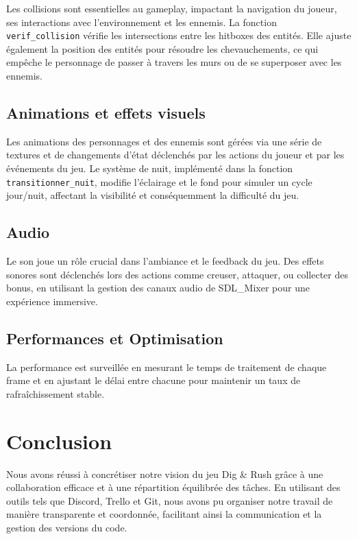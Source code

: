 \documentclass[a4paper,12pt]{article}
\begin{document}
Les collisions sont essentielles au gameplay, impactant la navigation du joueur, ses interactions avec l'environnement et les ennemis. La fonction \texttt{verif\_collision} vérifie les intersections entre les hitboxes des entités. Elle ajuste également la position des entités pour résoudre les chevauchements, ce qui empêche le personnage de passer à travers les murs ou de se superposer avec les ennemis.

\subsection{Animations et effets visuels}

Les animations des personnages et des ennemis sont gérées via une série de textures et de changements d'état déclenchés par les actions du joueur et par les événements du jeu. Le système de nuit, implémenté dans la fonction \texttt{transitionner\_nuit}, modifie l'éclairage et le fond pour simuler un cycle jour/nuit, affectant la visibilité et conséquemment la difficulté du jeu.

\subsection{Audio}

Le son joue un rôle crucial dans l'ambiance et le feedback du jeu. Des effets sonores sont déclenchés lors des actions comme creuser, attaquer, ou collecter des bonus, en utilisant la gestion des canaux audio de SDL\_Mixer pour une expérience immersive.

\subsection{Performances et Optimisation}

La performance est surveillée en mesurant le temps de traitement de chaque frame et en ajustant le délai entre chacune pour maintenir un taux de rafraîchissement stable.


\newpage
\section{Conclusion}

﻿Nous avons réussi à concrétiser notre vision du jeu Dig \& Rush grâce à une collaboration eﬀicace et à une répartition équilibrée des tâches. 
En  utilisant des outils tels que Discord, Trello et Git, nous avons pu organiser notre travail de manière transparente et coordonnée, facilitant ainsi la communication et la gestion des versions du code.
\end{document}
